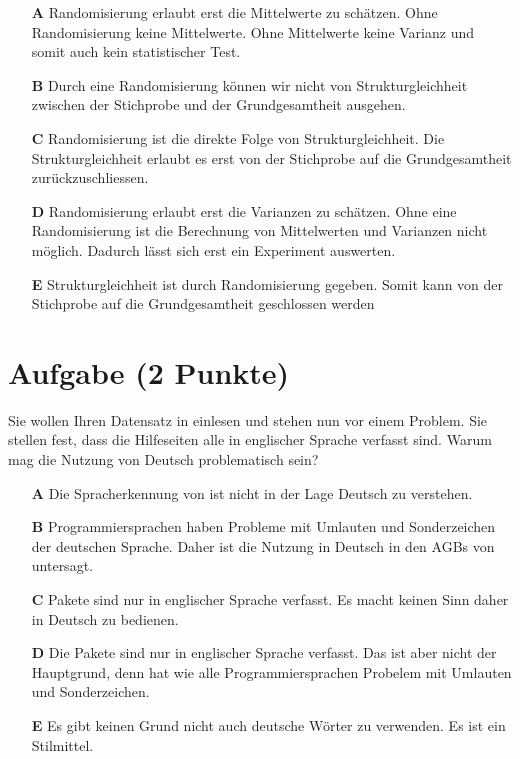 \documentclass[a4paper, 9pt]{scrartcl}\usepackage[]{graphicx}\usepackage[]{xcolor}
\begin{document}
\begin{enumerate}
\item [\textbf{A} \msquare] Randomisierung erlaubt erst die Mittelwerte zu schätzen. Ohne Randomisierung keine Mittelwerte. Ohne Mittelwerte keine Varianz und somit auch kein statistischer Test.
\item [\textbf{B} \msquare] Durch eine Randomisierung können wir nicht von Strukturgleichheit zwischen der Stichprobe und der Grundgesamtheit ausgehen.
\item [\textbf{C} \msquare] Randomisierung ist die direkte Folge von Strukturgleichheit. Die Strukturgleichheit erlaubt es erst von der Stichprobe auf die Grundgesamtheit zurückzuschliessen.
\item [\textbf{D} \msquare] Randomisierung erlaubt erst die Varianzen zu schätzen. Ohne eine Randomisierung ist die Berechnung von Mittelwerten und Varianzen nicht möglich. Dadurch lässt sich erst ein Experiment auswerten.
\item [\textbf{E} \msquare] Strukturgleichheit ist durch Randomisierung gegeben. Somit kann von der Stichprobe auf die Grundgesamtheit geschlossen werden
\end{enumerate}

\section{Aufgabe \hfill (2 Punkte)}



Sie wollen Ihren Datensatz in \Rlogo einlesen und stehen nun vor einem Problem. Sie stellen fest, dass die Hilfeseiten alle in englischer Sprache verfasst sind. Warum mag die Nutzung von Deutsch problematisch sein?



\begin{enumerate}
\item [\textbf{A} \msquare] Die Spracherkennung von \Rlogo ist nicht in der Lage Deutsch zu verstehen.
\item [\textbf{B} \msquare] Programmiersprachen haben Probleme mit Umlauten und Sonderzeichen der deutschen Sprache. Daher ist die Nutzung in Deutsch in den AGBs von \Rlogo untersagt.
\item [\textbf{C} \msquare] \Rlogo Pakete sind nur in englischer Sprache verfasst. Es macht keinen Sinn \Rlogo daher in Deutsch zu bedienen.
\item [\textbf{D} \msquare] Die \Rlogo Pakete sind nur in englischer Sprache verfasst. Das ist aber nicht der Hauptgrund, denn \Rlogo hat wie alle Programmiersprachen Probelem mit Umlauten und Sonderzeichen.
\item [\textbf{E} \msquare] Es gibt keinen Grund nicht auch deutsche Wörter zu verwenden. Es ist ein Stilmittel.
\end{enumerate}
\end{document}
